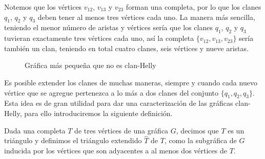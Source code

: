 \begin{center}
\end{center}
Notemos que los vértices $v_{12}$, $v_{13}$ y $v_{23}$ forman una completa, por lo que los clanes $q_1$, $q_2$ y $q_3$ deben tener al menos tres vértices cada uno. La manera más sencilla, teniendo el menor número de aristas y vértices sería que los clanes $q_1$, $q_2$ y $q_3$ tuvieran exactamente tres vértices cada uno, así la completa $\{v_{12}, v_{13}, v_{23}\}$ sería también un clan, teniendo en total cuatro clanes, seis vértices y nueve aristas.
\begin{figure}[H]\label{pequenh}
\centering
{}
\caption{Gráfica más pequeña que no es clan-Helly}
\end{figure}
Es posible extender los clanes de muchas maneras, siempre y cuando cada nuevo vértice que se agregue pertenezca a lo más a dos clanes del conjunto $\{q_1,q_2,q_3\}$.
Esta idea es de gran utilidad para dar una caracterización de las gráficas clan-Helly, para ello introduciremos la siguiente definición.
\begin{Defi}
Dada una completa $T$ de tres vértices de una gráfica $G$, decimos que $T$ es un triángulo y definimos el triángulo extendido $\hat{T}$ de $T$, como la subgráfica de $G$ inducida por los vértices que son adyacentes a al menos dos vértices de $T$.   
\end{Defi}

